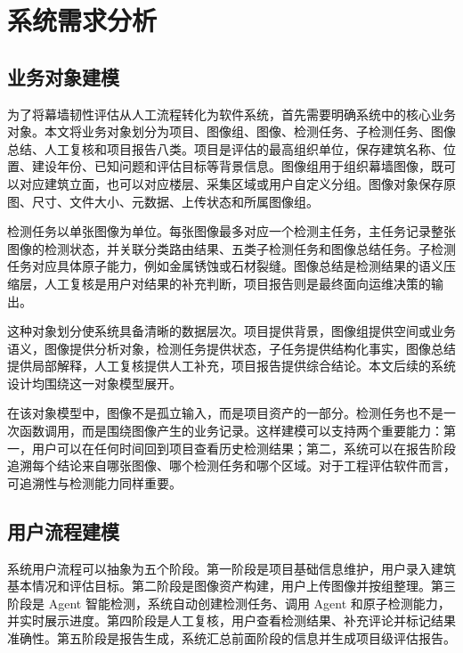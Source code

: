 \chapter{系统需求分析}
\label{chap:problem-requirements}

\section{业务对象建模}
\label{sec:business-object-model}

为了将幕墙韧性评估从人工流程转化为软件系统，首先需要明确系统中的核心业务对象。本文将业务对象划分为项目、图像组、图像、检测任务、子检测任务、图像总结、人工复核和项目报告八类。项目是评估的最高组织单位，保存建筑名称、位置、建设年份、已知问题和评估目标等背景信息。图像组用于组织幕墙图像，既可以对应建筑立面，也可以对应楼层、采集区域或用户自定义分组。图像对象保存原图、尺寸、文件大小、元数据、上传状态和所属图像组。

检测任务以单张图像为单位。每张图像最多对应一个检测主任务，主任务记录整张图像的检测状态，并关联分类路由结果、五类子检测任务和图像总结任务。子检测任务对应具体原子能力，例如金属锈蚀或石材裂缝。图像总结是检测结果的语义压缩层，人工复核是用户对结果的补充判断，项目报告则是最终面向运维决策的输出。

这种对象划分使系统具备清晰的数据层次。项目提供背景，图像组提供空间或业务语义，图像提供分析对象，检测任务提供状态，子任务提供结构化事实，图像总结提供局部解释，人工复核提供人工补充，项目报告提供综合结论。本文后续的系统设计均围绕这一对象模型展开。

在该对象模型中，图像不是孤立输入，而是项目资产的一部分。检测任务也不是一次函数调用，而是围绕图像产生的业务记录。这样建模可以支持两个重要能力：第一，用户可以在任何时间回到项目查看历史检测结果；第二，系统可以在报告阶段追溯每个结论来自哪张图像、哪个检测任务和哪个区域。对于工程评估软件而言，可追溯性与检测能力同样重要。

\section{用户流程建模}
\label{sec:user-process-model}

系统用户流程可以抽象为五个阶段。第一阶段是项目基础信息维护，用户录入建筑基本情况和评估目标。第二阶段是图像资产构建，用户上传图像并按组整理。第三阶段是 Agent 智能检测，系统自动创建检测任务、调用 Agent 和原子检测能力，并实时展示进度。第四阶段是人工复核，用户查看检测结果、补充评论并标记结果准确性。第五阶段是报告生成，系统汇总前面阶段的信息并生成项目级评估报告。

